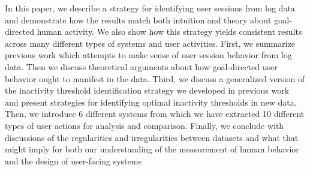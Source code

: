 In this paper, we describe a strategy for identifying user sessions from log data and demonstrate how the results match both intuition and theory about goal-directed human activity.  We also show how this strategy yields consistent results across many different types of systems and user activities.  First, we summarize previous work which attempts to make sense of user session behavior from log data.  Then we discuss theoretical arguments about how goal-directed user behavior ought to manifest in the data.  Third, we discuss a generalized version of the inactivity threshold identification strategy we developed in previous work~\cite{geiger2013using} and present strategies for identifying optimal inactivity thresholds in new data.  Then, we introduce 6 different systems from which we have extracted 10 different types of user actions for analysis and comparison. Finally, we conclude with discussions of the regularities and irregularities between datasets and what that might imply for both our understanding of the measurement of human behavior and the design of user-facing systems
